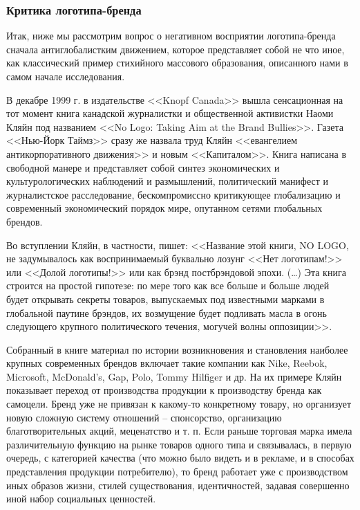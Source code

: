 \subsubsection{Критика логотипа-бренда}

Итак, ниже мы рассмотрим вопрос о негативном восприятии логотипа-бренда сначала антиглобалистким
движением, которое представляет собой не что иное, как классический пример стихийного массового
образования, описанного нами в самом начале исследования.

В декабре 1999 г. в издательстве <<Knopf Canada>> вышла сенсационная на тот момент книга канадской
журналистки и общественной активистки Наоми Кляйн под названием <<No Logo: Taking Aim at the Brand
Bullies>>. Газета <<Нью-Йорк Таймз>> сразу же назвала труд Кляйн <<евангелием антикорпоративного
движения>> и новым <<Капиталом>>. Книга написана в свободной манере и представляет собой синтез
экономических и культурологических наблюдений и размышлений, политический манифест и журналистское
расследование, бескомпромиссно критикующее глобализацию и современный экономический порядок мире,
опутанном сетями глобальных брендов.

Во вступлении Кляйн, в частности, пишет: <<Название этой книги, NO LOGO, не задумывалось как
воспринимаемый буквально лозунг <<Нет логотипам!>> или <<Долой логотипы!>> или как брэнд
постбрэндовой эпохи. (\ldots) Эта книга строится на простой гипотезе: по мере того как все больше и
больше людей будет открывать секреты товаров, выпускаемых под известными марками в глобальной
паутине брэндов, их возмущение будет подливать масла в огонь следующего крупного политического
течения, могучей волны оппозиции>>. \autocite[][16-17]{klein2003}

Собранный в книге материал по истории возникновения и становления наиболее крупных современных
брендов включает такие компании как Nike, Reebok, Microsoft, McDonald’s, Gap, Polo, Tommy Hilfiger и
др. На их примере Кляйн показывает переход от производства продукции к производству бренда как
самоцели. Бренд уже не привязан к какому-то конкретному товару, но организует новую сложную систему
отношений -- спонсорство, организацию благотворительных акций, меценатство и т. п. Если раньше
торговая марка имела различительную функцию на рынке товаров одного типа и связывалась, в первую
очередь, с категорией качества (что можно было видеть и в рекламе, и в способах представления
продукции потребителю), то бренд работает уже с производством иных образов жизни, стилей
существования, идентичностей, задавая совершенно иной набор социальных ценностей.

